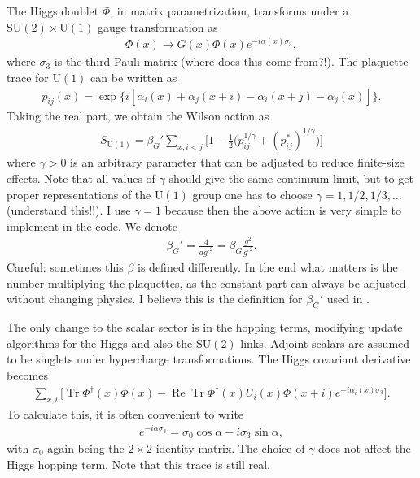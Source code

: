\documentclass[11pt,a4paper]{article}
\newcommand\RE{\operatorname{Re}}
\newcommand\Tr{\operatorname{Tr}}
\newcommand\he[1]{#1^\dagger}%
\newcommand\gr[1]{\mathrm{#1}}%
\newcommand\lauri[1]{{\color{myorange}#1}}
\begin{document}
The Higgs doublet $\Phi$, in matrix parametrization, transforms under a $\gr{SU(2) \times U(1)}$ gauge transformation as 
\begin{align}
\Phi(x) \rightarrow G(x) \Phi(x) e^{-i \alpha(x)\sigma_3},
\end{align}
where $\sigma_3$ is the third Pauli matrix \lauri{(where does this come from?!)}. The plaquette trace for $\gr{U(1)}$ can be written as 
\begin{align}
p_{ij}(x) = \exp\{i[\alpha_i(x) + \alpha_j(x+i) - \alpha_i(x+j) - \alpha_j(x)]\}.
\end{align}
Taking the real part, we obtain the Wilson action as 
\begin{align}
S_\gr{U(1)} = \beta_G' \sum_{x, i<j} \Big[ 1 - \frac12 \Big(p_{ij}^{1/\gamma} + (p_{ij}^*)^{1/\gamma}\Big)\Big] 
\end{align}
where $\gamma > 0$ is an arbitrary parameter that can be adjusted to reduce finite-size effects. Note that all values of $\gamma$ should give the same continuum limit, but to get proper representations of the $\gr{U(1)}$ group one has to choose  $\gamma = 1, 1/2, 1/3, \dots$ \lauri{(understand this!!)}. I use $\gamma = 1$ because then the above action is very simple to implement in the code. We denote 
\begin{align}
\beta_G' = \frac{4}{a {g'}^2} = \beta_G \frac{g^2}{{g'}^2}.
\end{align}
\lauri{Careful:} sometimes this $\beta$ is defined differently. In the end what matters is the number multiplying the plaquettes, as the constant part can always be adjusted without changing physics. I believe this is the definition for $\beta_G'$ used in \cite{Kajantie:1996qd}.

The only change to the scalar sector is in the hopping terms, modifying update algorithms for the Higgs and also the $\gr{SU(2)}$ links. \lauri{Adjoint scalars are assumed to be singlets under hypercharge transformations.} The Higgs covariant derivative becomes 
\begin{align}
\sum_{x, i} \Big[ \Tr \he\Phi(x)\Phi(x) - \RE\Tr \he\Phi(x)U_i(x)\Phi(x+i)e^{-i \alpha_i(x)\sigma_3}\Big].
\end{align}
To calculate this, it is often convenient to write 
\begin{align}
e^{-i \alpha\sigma_3} = \sigma_0\cos\alpha - i \sigma_3 \sin\alpha,
\end{align}
with $\sigma_0$ again being the $2\times 2$ identity matrix. The choice of $\gamma$ does not affect the Higgs hopping term. Note that this trace is still real.
\end{document}
